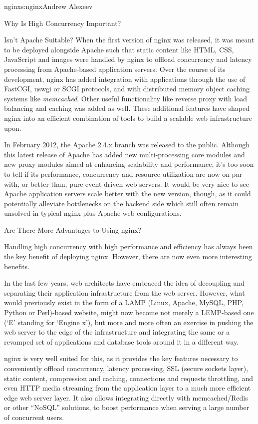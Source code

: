 \begin{aosachapter}{nginx}{s:nginx}{Andrew Alexeev}
\begin{aosasect1}{Why Is High Concurrency Important?}
\begin{aosasect2}{Isn't Apache Suitable?}
When the first version of nginx was released, it was meant to be
deployed alongside Apache such that static content like HTML, CSS,
JavaScript and images were handled by nginx to offload concurrency and
latency processing from Apache-based application servers. Over the
course of its development, nginx has added integration with
applications through the use of FastCGI, uswgi or SCGI protocols, and
with distributed memory object caching systems like
\emph{memcached}. Other useful functionality like reverse proxy with
load balancing and caching was added as well. These additional
features have shaped nginx into an efficient combination of tools
to build a scalable web infrastructure upon.

In February 2012, the Apache 2.4.x branch was released to the public. Although
this latest release of Apache has added new multi-processing core modules and
new proxy modules aimed at enhancing scalability and performance, it's too soon
to tell if its performance, concurrency and resource utilization are now on par
with, or better than, pure event-driven web servers. It would be very nice to
see Apache application servers scale better with the new version, though, as it
could potentially alleviate bottlenecks on the backend side which still often
remain unsolved in typical nginx-plus-Apache web configurations.

\end{aosasect2}

\begin{aosasect2}{Are There More Advantages to Using nginx?}

Handling high concurrency with high performance and efficiency has
always been the key benefit of deploying nginx. However, there
are now even more interesting benefits.

In the last few years, web architects have embraced the idea of
decoupling and separating their application infrastructure from the
web server. However, what would previously exist in the form of a LAMP
(Linux, Apache, MySQL, PHP, Python or Perl)-based website, might now
become not merely a LEMP-based one (`E' standing for `Engine
x'), but more and more often an exercise in pushing the web server to
the edge of the infrastructure and integrating the same or a revamped
set of applications and database tools around it in a different way.

nginx is very well suited for this, as it provides the key features
necessary to conveniently offload concurrency, latency processing, SSL
(secure sockets layer), static content, compression and caching,
connections and requests throttling, and even HTTP media streaming
from the application layer to a much more efficient edge web server
layer. It also allows integrating directly with memcached/Redis or
other ``NoSQL'' solutions, to boost performance when serving a large
number of concurrent users.


\end{aosasect2}
\end{aosasect1}
\end{aosachapter}
